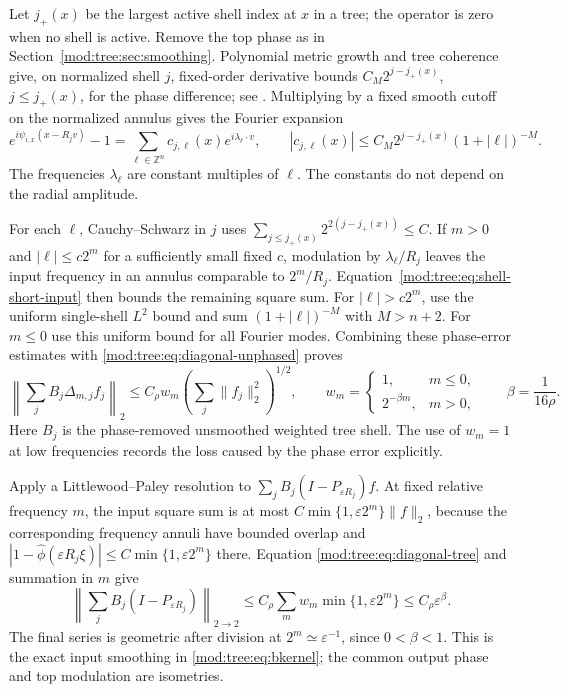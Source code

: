 \documentclass[11pt]{article}
\numberwithin{equation}{section}
\theoremstyle{remark}
\theoremstyle{definition}
\begin{document}
Let $j_+(x)$ be the largest active shell index at $x$ in a tree; the
operator is zero when no shell is active. Remove the top phase as in
Section~\ref{mod:tree:sec:smoothing}. Polynomial metric growth and tree
coherence give, on normalized shell $j$, fixed-order derivative bounds
$C_M2^{j-j_+(x)}$, $j\le j_+(x)$, for the phase difference; see
\cite[(6.1) and the proof of Lemma 6.2]{BDJST}. Multiplying by a fixed
smooth cutoff on the normalized annulus gives the Fourier expansion
\[
 e^{i\psi_{i,x}(x-R_jv)}-1
 =\sum_{\ell\in\mathbb Z^n}c_{j,\ell}(x)e^{i\lambda_\ell\cdot v},
 \qquad
 |c_{j,\ell}(x)|\le C_M2^{j-j_+(x)}(1+|\ell|)^{-M}.
\]
The frequencies $\lambda_\ell$ are constant multiples of $\ell$.
The constants do not depend on the radial amplitude.

For each $\ell$, Cauchy--Schwarz in $j$ uses
$\sum_{j\le j_+(x)}2^{2(j-j_+(x))}\le C$. If $m>0$ and
$|\ell|\le c2^m$ for a sufficiently small fixed $c$, modulation by
$\lambda_\ell/R_j$ leaves the input frequency in an annulus comparable
to $2^m/R_j$. Equation~\eqref{mod:tree:eq:shell-short-input} then
bounds the remaining square sum. For $|\ell|>c2^m$, use the uniform
single-shell $L^2$ bound and sum $(1+|\ell|)^{-M}$ with $M>n+2$.
For $m\le0$ use this uniform bound for all Fourier modes. Combining
these phase-error estimates with
\eqref{mod:tree:eq:diagonal-unphased} proves
\begin{equation}\label{mod:tree:eq:diagonal-tree}
 \left\|\sum_jB_j\Delta_{m,j}f_j\right\|_2
 \le C_\rho w_m\left(\sum_j\|f_j\|_2^2\right)^{1/2},
 \qquad
 w_m=\begin{cases}1,&m\le0,\\2^{-\beta m},&m>0,\end{cases}
 \qquad \beta=\frac1{16\rho}.
\end{equation}
Here $B_j$ is the phase-removed unsmoothed weighted tree shell.
The use of $w_m=1$ at low frequencies records the loss caused by the
phase error explicitly.

Apply a Littlewood--Paley resolution to
$\sum_jB_j(I-P_{\varepsilon R_j})f$. At fixed relative frequency $m$,
the input square sum is at most
$C\min\{1,\varepsilon2^m\}\|f\|_2$, because the corresponding frequency
annuli have bounded overlap and
$|1-\widehat\phi(\varepsilon R_j\xi)|
 \le C\min\{1,\varepsilon2^m\}$ there. Equation
\eqref{mod:tree:eq:diagonal-tree} and summation in $m$ give
\begin{equation}\label{mod:tree:eq:approx}
 \left\|\sum_jB_j(I-P_{\varepsilon R_j})\right\|_{2\to2}
 \le C_\rho\sum_mw_m\min\{1,\varepsilon2^m\}
 \le C_\rho\varepsilon^\beta.
\end{equation}
The final series is geometric after division at
$2^m\simeq\varepsilon^{-1}$, since $0<\beta<1$. This is the exact
input smoothing in \eqref{mod:tree:eq:bkernel}; the common output
phase and top modulation are isometries.
\end{document}
